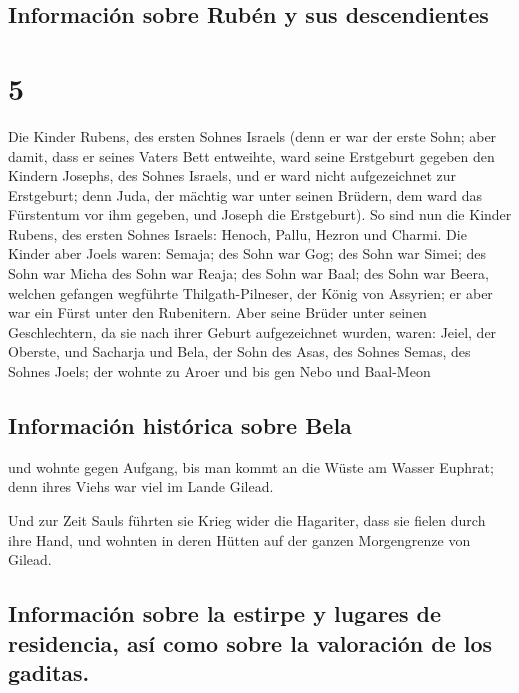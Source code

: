 \hypertarget{informaciuxf3n-sobre-rubuxe9n-y-sus-descendientes}{%
\subsection{Información sobre Rubén y sus
descendientes}\label{informaciuxf3n-sobre-rubuxe9n-y-sus-descendientes}}

\hypertarget{section-4}{%
\section{5}\label{section-4}}

 Die Kinder Rubens, des ersten Sohnes Israels (denn er war
der erste Sohn; aber damit, dass er seines Vaters Bett entweihte, ward
seine Erstgeburt gegeben den Kindern Josephs, des Sohnes Israels, und er
ward nicht aufgezeichnet zur Erstgeburt;  denn Juda, der
mächtig war unter seinen Brüdern, dem ward das Fürstentum vor ihm
gegeben, und Joseph die Erstgeburt).  So sind nun die
Kinder Rubens, des ersten Sohnes Israels: Henoch, Pallu, Hezron und
Charmi.  Die Kinder aber Joels waren: Semaja; des Sohn war
Gog; des Sohn war Simei;  des Sohn war Micha des Sohn war
Reaja; des Sohn war Baal;  des Sohn war Beera, welchen
gefangen wegführte Thilgath-Pilneser, der König von Assyrien; er aber
war ein Fürst unter den Rubenitern.  Aber seine Brüder
unter seinen Geschlechtern, da sie nach ihrer Geburt aufgezeichnet
wurden, waren: Jeiel, der Oberste, und Sacharja  und Bela,
der Sohn des Asas, des Sohnes Semas, des Sohnes Joels; der wohnte zu
Aroer und bis gen Nebo und Baal-Meon

\hypertarget{informaciuxf3n-histuxf3rica-sobre-bela}{%
\subsection{Información histórica sobre
Bela}\label{informaciuxf3n-histuxf3rica-sobre-bela}}

 und wohnte gegen Aufgang, bis man kommt an die Wüste am
Wasser Euphrat; denn ihres Viehs war viel im Lande Gilead.

 Und zur Zeit Sauls führten sie Krieg wider die
Hagariter, dass sie fielen durch ihre Hand, und wohnten in deren Hütten
auf der ganzen Morgengrenze von Gilead.

\hypertarget{informaciuxf3n-sobre-la-estirpe-y-lugares-de-residencia-asuxed-como-sobre-la-valoraciuxf3n-de-los-gaditas.}{%
\subsection{Información sobre la estirpe y lugares de residencia, así
como sobre la valoración de los
gaditas.}\label{informaciuxf3n-sobre-la-estirpe-y-lugares-de-residencia-asuxed-como-sobre-la-valoraciuxf3n-de-los-gaditas.}}

